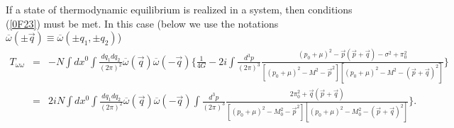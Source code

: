 \documentclass[12pt,a4paper]{article}
\begin{document}
If a state of thermodynamic equilibrium is realized in a system, then conditions (\ref{0F23})
must be met. In this case (below we use the notations $\overline\omega (\pm\vec q)\equiv\overline
\omega (\pm q_1,\pm q_2)$)
\begin{eqnarray}
T_{\omega\omega}&=&-N\int dx^0\int \frac{dq_1dq_2}{(2\pi)^2}
\overline \omega (\vec q)\overline \omega (-\vec q)\Big\{\frac{1}{4G}
-2i\int \frac{d^3p}{(2\pi)^3}\frac{(p_0+\mu)^2-\vec p(\vec p+\vec q)-
\sigma^2+\pi_0^2}{[(p_0+\mu)^2-M^2-\vec p^2][(p_0+\mu)^2-M^2-(\vec p+\vec q)^2]}
\Big\}\nonumber\\&=&2iN\int dx^0\int \frac{dq_1dq_2}{(2\pi)^2}
\overline \omega (\vec q)\overline \omega (-\vec q)\int \frac{d^3p}{(2\pi)^3}\frac{2\pi_0^2+
\vec q(\vec p+\vec q)}{[(p_0+\mu)^2-M_0^2-\vec p^2][(p_0+\mu)^2-M_0^2-(\vec p+\vec q)^2]}
\Big\}.
\label{F27}
\end{eqnarray}
\end{document}
